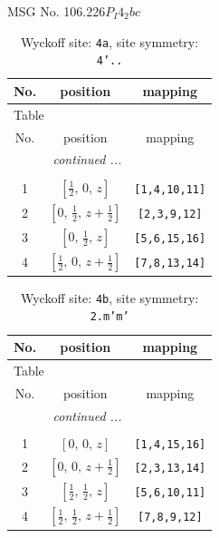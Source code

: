 \documentclass[fleqn,8pt]{jsarticle}
\begin{document}
\setcounter{MaxMatrixCols}{32}

\renewcommand{\tablename}{Table~}
\renewcommand{\figurename}{Figure~}
\begin{center}
\LARGE
MSG No. 106.226\quad$P_{I}4_{2}bc$
\end{center}
\renewcommand{\arraystretch}{1.2}
\begin{longtable}{ccc}
\caption{Wyckoff site: {\tt 4a}, site symmetry: {\tt 4'..}}
 \\
 \hline \hline
No. & position & mapping \\ \hline \endfirsthead

\multicolumn{2}{l}{\tablename\ \thetable{}} \\
 \hline \hline
No. & position & mapping \\ \hline \endhead

 \hline \hline
\multicolumn{2}{r}{\footnotesize\it continued ...} \\ \endfoot

 \hline \hline
\multicolumn{2}{r}{} \\ \endlastfoot

1 & $\left[ \frac{1}{2},\, 0,\, z \right]$ & {\tt [1,4,10,11]} \\ \hline
2 & $\left[ 0,\, \frac{1}{2},\, z + \frac{1}{2} \right]$ & {\tt [2,3,9,12]} \\ \hline
3 & $\left[ 0,\, \frac{1}{2},\, z \right]$ & {\tt [5,6,15,16]} \\ \hline
4 & $\left[ \frac{1}{2},\, 0,\, z + \frac{1}{2} \right]$ & {\tt [7,8,13,14]} \\
\end{longtable}
\renewcommand{\arraystretch}{1.2}
\begin{longtable}{ccc}
\caption{Wyckoff site: {\tt 4b}, site symmetry: {\tt 2.m'm'}}
 \\
 \hline \hline
No. & position & mapping \\ \hline \endfirsthead

\multicolumn{2}{l}{\tablename\ \thetable{}} \\
 \hline \hline
No. & position & mapping \\ \hline \endhead

 \hline \hline
\multicolumn{2}{r}{\footnotesize\it continued ...} \\ \endfoot

 \hline \hline
\multicolumn{2}{r}{} \\ \endlastfoot

1 & $\left[ 0,\, 0,\, z \right]$ & {\tt [1,4,15,16]} \\ \hline
2 & $\left[ 0,\, 0,\, z + \frac{1}{2} \right]$ & {\tt [2,3,13,14]} \\ \hline
3 & $\left[ \frac{1}{2},\, \frac{1}{2},\, z \right]$ & {\tt [5,6,10,11]} \\ \hline
4 & $\left[ \frac{1}{2},\, \frac{1}{2},\, z + \frac{1}{2} \right]$ & {\tt [7,8,9,12]} \\
\end{longtable}
\end{document}
